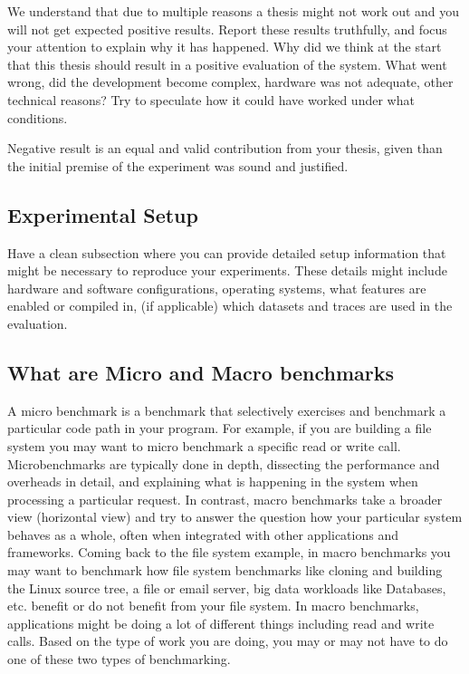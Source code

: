 \documentclass{article}
\begin{document}
We understand that due to multiple reasons a thesis might not work out and you will not get expected positive results. Report these results truthfully, and focus your attention to explain why it has happened. Why did we think at the start that this thesis should result in a positive evaluation of the system. What went wrong, did the development become complex, hardware was not adequate, other technical reasons? Try to speculate how it could have worked under what conditions. 

Negative result is an equal and valid contribution from your thesis, given than the initial premise of the experiment was sound and justified. 

\subsection{Experimental Setup}
Have a clean subsection where you can provide detailed setup information that might be necessary to reproduce your experiments. These details might include hardware and software configurations, operating systems, what features are enabled or compiled in, (if applicable) which datasets and traces are used in the evaluation. 

\subsection*{What are Micro and Macro benchmarks}
A micro benchmark is a benchmark that selectively exercises and benchmark a particular code path in your program. For example, if you are building a file system you may want to micro benchmark a specific read or write call. Microbenchmarks are typically done in depth, dissecting the performance and overheads in detail, and explaining what is happening in the system when processing a particular request. In contrast, macro benchmarks take a broader view (horizontal view) and try to answer the question how your particular system behaves as a whole, often when integrated with other applications and frameworks. Coming back to the file system example, in macro benchmarks you may want to benchmark how file system benchmarks like cloning and building the Linux source tree, a file or email server, big data workloads like Databases, etc. benefit or do not benefit from your file system. In macro benchmarks, applications might be doing a lot of different things including read and write calls. Based on the type of work you are doing, you may or may not have to do one of these two types of benchmarking. 
\end{document}

